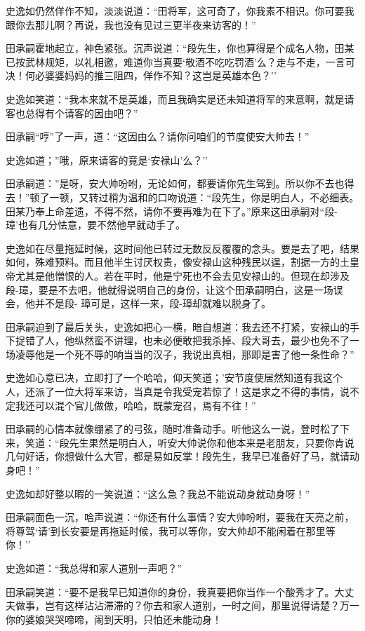 \documentclass[12pt,oneside]{book}
\begin{document}
史逸如仍然佯作不知，淡淡说道：``田将军，这可奇了，你我素不相识。你可要我跟你去那儿啊？再说，我也没有见过三更半夜来访客的！''

田承嗣霍地起立，神色紧张。沉声说道：``段先生，你也算得是个成名人物，田某已按武林规矩，以礼相邀，难道你当真要`敬酒不吃吃罚酒'么？走与不走，一言可决！何必婆婆妈妈的推三阻四，佯作不知？这岂是英雄本色？''

史逸如笑道：``我本来就不是英雄，而且我确实是还未知道将军的来意啊，就是请客也总得有个请客的因由吧？''

田承嗣``哼''了一声，道：``这因由么？请你问咱们的节度使安大帅去！''

史逸如道；''哦，原来请客的竟是`安禄山'么？''

田承嗣道：''是呀，安大帅吩咐，无论如何，都要请你先生驾到。所以你不去也得去！''顿了一顿，又转过稍为温和的口吻说道：``段先生，你是明白人，不必细表。田某乃奉上命差遗，不得不然，请你不要再难为在下了。''原来这田承嗣对``段-璋'也有几分怯意，要不然他早就动手了。

史逸如在尽量拖延时候，这时间他已转过无数反反覆覆的念头。要是去了吧，结果如何，殊难预料。而且他半生讨厌权贵，像安禄山这种残民以逞，割据一方的土皇帝尤其是他憎恨的人。若在平时，他是宁死也不会去见安禄山的。但现在却涉及段-璋，要是不去吧，他就得说明自己的身份，让这个田承嗣明白，这是一场误会，他并不是段-
璋可是，这样一来，段-璋却就难以脱身了。

田承嗣迫到了最后关头，史逸如把心一横，暗自想道：我去还不打紧，安禄山的手下捉错了人，他纵然蛮不讲理，也未必便敢把我杀掉、段大哥去，最少也免不了一场凌辱他是一个死不辱的响当当的汉子，我说出真相，那即是害了他一条性命？''

史逸如心意已决，立即打了一个哈哈，仰天笑道；'安节度使居然知道有我这个人，还派了一位大将军来访，当真是令我受宠若惊了！这是求之不得的事情，说不定我还可以混个官儿做做，哈哈，既蒙宠召，焉有不往！''

田承嗣的心情本就像绷紧了的弓弦，随时准备动手。听他这么一说，登时松了下来，笑道：``段先生果然是明白人，听安大帅说你和他本来是老朋友，只要你肯说几句好话，你想做什么大官，都是易如反掌！段先生，我早已准备好了马，就请动身吧！''

史逸如却好整以暇的一笑说道：``这么急？我总不能说动身就动身呀！''

田承嗣面色一沉，哈声说道：``你还有什么事情？安大帅吩咐，要我在天亮之前，将尊驾`请'到长安要是再拖延时候，我可以等你，安大帅却不能闲着在那里等你！''

史逸如道：``我总得和家人道别一声吧？''

田承嗣笑道：``要不是我早已知道你的身份，我真要把你当作一个酸秀才了。大丈夫做事，岂有这样沾沾滞滞的？你去和家人道别，一时之间，那里说得请楚？万一你的婆娘哭哭啼啼，闹到天明，只怕还未能动身！
\end{document}

